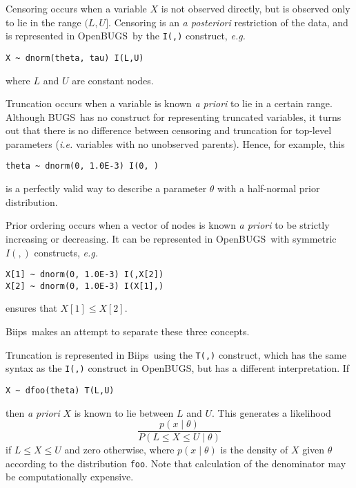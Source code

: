 \documentclass[11pt, a4paper, titlepage]{report}
\newcommand{\biips}{\textsf{Biips}}
\newcommand{\BUGS}{\textsf{BUGS}}
\newcommand{\OpenBUGS}{\textsf{OpenBUGS}}
\begin{document}
Censoring occurs when a variable $X$ is not observed directly,
but is observed only to lie in the range $(L,U]$.  Censoring is
an {\em a posteriori} restriction of the data, and is represented
in \OpenBUGS\ by the \texttt{I(,)} construct, {\em e.g.}
\begin{verbatim}
X ~ dnorm(theta, tau) I(L,U)
\end{verbatim}
where $L$ and $U$ are constant nodes.

Truncation occurs when a variable is known {\em a priori} to lie in
a certain range.  Although \BUGS\ has no construct for representing
truncated variables, it turns out that there is no difference between
censoring and truncation for top-level parameters ({\em i.e.} variables
with no unobserved parents).  Hence, for example, this
\begin{verbatim}
theta ~ dnorm(0, 1.0E-3) I(0, )
\end{verbatim}
is a perfectly valid way to describe a parameter $\theta$ with a
half-normal prior distribution.

Prior ordering occurs when a vector of nodes is known {\em a priori}
to be strictly increasing or decreasing. It can be represented in
\OpenBUGS\ with symmetric $I(,)$ constructs,  {\em e.g.}
\begin{verbatim}
X[1] ~ dnorm(0, 1.0E-3) I(,X[2])
X[2] ~ dnorm(0, 1.0E-3) I(X[1],)
\end{verbatim}
ensures that $X[1] \leq X[2]$.

\biips\ makes an attempt to separate these three concepts.


Truncation is represented in \biips\ using the \texttt{T(,)} construct,
which has the same syntax as the \texttt{I(,)} construct in \OpenBUGS,
but has a different interpretation. If
\begin{verbatim}
X ~ dfoo(theta) T(L,U)
\end{verbatim}
then {\em a priori} $X$ is known to lie between $L$ and $U$. This
generates a likelihood
\[
\frac{p(x \mid \theta)}{P(L \leq X \leq U \mid \theta)}
\]
if $L \leq X \leq U$ and zero otherwise, where $p(x \mid \theta)$ is
the density of $X$ given $\theta$ according to the distribution
\texttt{foo}. Note that calculation of the denominator may be
computationally expensive.
\end{document}
